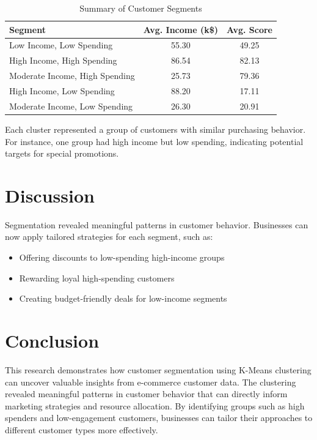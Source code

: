 \documentclass[conference]{IEEEtran}
\begin{document}
\begin{table}[H]
\centering
\caption{Summary of Customer Segments}
\begin{tabular}{|l|c|c|}
\hline
\textbf{Segment} & \textbf{Avg. Income (k\$)} & \textbf{Avg. Score} \\
\hline
Low Income, Low Spending       & 55.30 & 49.25 \\
High Income, High Spending     & 86.54 & 82.13 \\
Moderate Income, High Spending & 25.73 & 79.36 \\
High Income, Low Spending      & 88.20 & 17.11 \\
Moderate Income, Low Spending     & 26.30 & 20.91 \\
\hline
\end{tabular}
\end{table}


Each cluster represented a group of customers with similar purchasing behavior. For instance, one group had high income but low spending, indicating potential targets for special promotions.

\section{Discussion}
Segmentation revealed meaningful patterns in customer behavior. Businesses can now apply tailored strategies for each segment, such as:

\begin{itemize}
    \item Offering discounts to low-spending high-income groups
    \item Rewarding loyal high-spending customers
    \item Creating budget-friendly deals for low-income segments
\end{itemize}

\section{Conclusion}
This research demonstrates how customer segmentation using K-Means clustering can uncover valuable insights from e-commerce customer data. The clustering revealed meaningful patterns in customer behavior that can directly inform marketing strategies and resource allocation. By identifying groups such as high spenders and low-engagement customers, businesses can tailor their approaches to different customer types more effectively.
\end{document}
